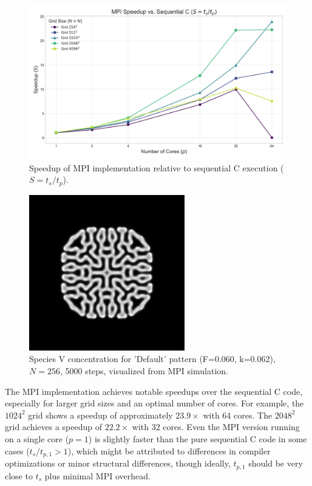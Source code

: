 \documentclass[9pt]{IEEEtran} %
\begin{document}
\begin{figure}[H]
    \centering
    \includegraphics[width=0.9\columnwidth]{mpi_speedup_plot_vs_seq1.png} 
    \caption{Speedup of MPI implementation relative to sequential C execution ($S=t_s/t_p$).}
    \label{fig:speedup_plot_mpi}
\end{figure}

\begin{figure}[H]
    \centering
    \includegraphics[width=0.7\columnwidth]{default.png} 
    \caption{Species V concentration for 'Default' pattern (F=0.060, k=0.062), $N=256$, 5000 steps, visualized from MPI simulation.}
    \label{fig:vis_example_mpi}
\end{figure}

The MPI implementation achieves notable speedups over the sequential C code, especially for larger grid sizes and an optimal number of cores. For example, the $1024^2$ grid shows a speedup of approximately $23.9\times$ with 64 cores. The $2048^2$ grid achieves a speedup of $22.2\times$ with 32 cores. Even the MPI version running on a single core ($p=1$) is slightly faster than the pure sequential C code in some cases ($t_s/t_{p,1} > 1$), which might be attributed to differences in compiler optimizations or minor structural differences, though ideally, $t_{p,1}$ should be very close to $t_s$ plus minimal MPI overhead.
\end{document}
